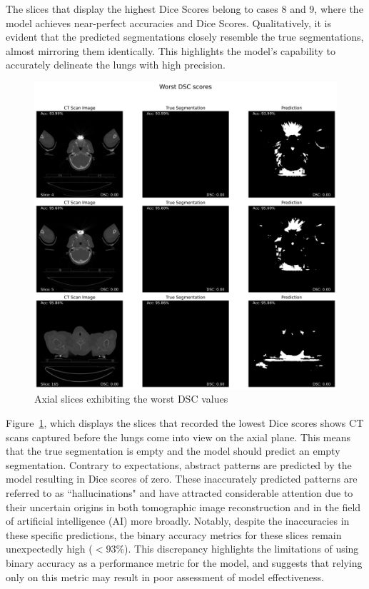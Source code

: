 \documentclass[12pt]{report}
\begin{document}
The slices that display the highest Dice Scores belong to cases 8 and 9, where the model achieves near-perfect accuracies and Dice Scores. Qualitatively, it is evident that the predicted segmentations closely resemble the true segmentations, almost mirroring them identically. This highlights the model's capability to accurately delineate the lungs with high precision.

\begin{figure}[ht]
    \centering
    \includegraphics[width=\textwidth]{Worst_DSC_scores.png}
    \caption{Axial slices exhibiting the worst DSC values}
    \label{fig:worst_dsc_scores}
\end{figure}

Figure~\ref{fig:worst_dsc_scores}, which displays the slices that recorded the lowest Dice scores shows CT scans captured before the lungs come into view on the axial plane. This means that the true segmentation is empty and the model should predict an empty segmentation. Contrary to expectations, abstract patterns are predicted by the model resulting in Dice scores of zero. These inaccurately predicted patterns are referred to as ``hallucinations" and have attracted considerable attention due to their uncertain origins in both tomographic image reconstruction and in the field of artificial intelligence (AI) more broadly.\cite{bhadra_hallucinations_2021, noauthor_investigating_nodate, alkaissi_artificial_nodate} Notably, despite the inaccuracies in these specific predictions, the binary accuracy metrics for these slices remain unexpectedly high ($< 93\%$). This discrepancy highlights the limitations of using binary accuracy as a performance metric for the model, and suggests that relying only on this metric may result in poor assessment of model effectiveness.
\end{document}
